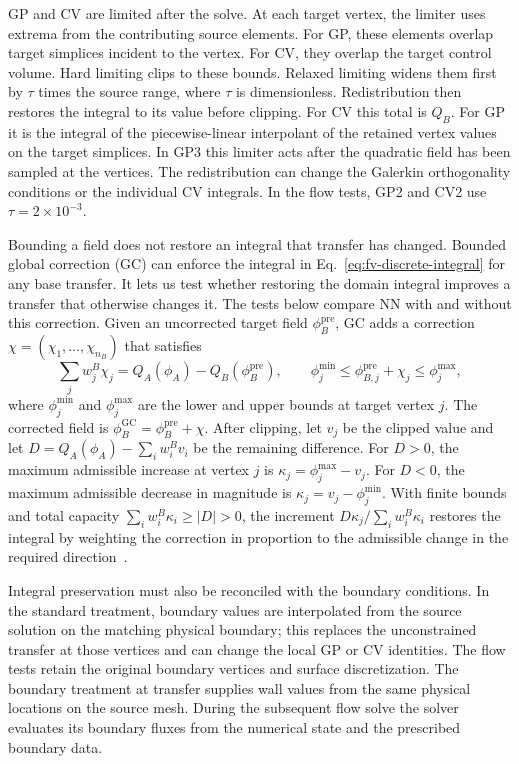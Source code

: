 \documentclass[a4paper,fleqn]{cas-sc}
\begin{document}
GP and CV are limited after the solve. At each target vertex, the limiter uses extrema from the contributing source elements. For GP, these elements overlap target simplices incident to the vertex. For CV, they overlap the target control volume. Hard limiting clips to these bounds. Relaxed limiting widens them first by $\tau$ times the source range, where $\tau$ is dimensionless. Redistribution then restores the integral to its value before clipping. For CV this total is $Q_B$. For GP it is the integral of the piecewise-linear interpolant of the retained vertex values on the target simplices. In GP3 this limiter acts after the quadratic field has been sampled at the vertices. The redistribution can change the Galerkin orthogonality conditions or the individual CV integrals. In the flow tests, GP2 and CV2 use $\tau=2\times10^{-3}$.

Bounding a field does not restore an integral that transfer has changed. Bounded global correction (GC) can enforce the integral in Eq.~\eqref{eq:fv-discrete-integral} for any base transfer. It lets us test whether restoring the domain integral improves a transfer that otherwise changes it. The tests below compare NN with and without this correction. Given an uncorrected target field $\phi_B^{\mathrm{pre}}$, GC adds a correction $\chi=(\chi_1,\ldots,\chi_{n_B})$ that satisfies
\begin{equation}
 \sum_jw_j^B\chi_j=Q_A(\phi_A)-Q_B(\phi_B^{\mathrm{pre}}),
 \qquad \phi_j^{\min}\leq\phi_{B,j}^{\mathrm{pre}}+\chi_j\leq \phi_j^{\max},
 \label{eq:global-correction-constraint}
\end{equation}
where $\phi_j^{\min}$ and $\phi_j^{\max}$ are the lower and upper bounds at target vertex $j$. The corrected field is $\phi_B^{\mathrm{GC}}=\phi_B^{\mathrm{pre}}+\chi$. After clipping, let $v_j$ be the clipped value and let $D=Q_A(\phi_A)-\sum_i w_i^B v_i$ be the remaining difference. For $D>0$, the maximum admissible increase at vertex $j$ is $\kappa_j=\phi_j^{\max}-v_j$. For $D<0$, the maximum admissible decrease in magnitude is $\kappa_j=v_j-\phi_j^{\min}$. With finite bounds and total capacity $\sum_i w_i^B\kappa_i\geq |D|>0$, the increment $D\kappa_j/\sum_i w_i^B\kappa_i$ restores the integral by weighting the correction in proportion to the admissible change in the required direction~\cite{ShashkovWendroff2004,KucharikShashkovWendroff2003}.

Integral preservation must also be reconciled with the boundary conditions. In the standard treatment, boundary values are interpolated from the source solution on the matching physical boundary; this replaces the unconstrained transfer at those vertices and can change the local GP or CV identities. The flow tests retain the original boundary vertices and surface discretization. The boundary treatment at transfer supplies wall values from the same physical locations on the source mesh. During the subsequent flow solve the solver evaluates its boundary fluxes from the numerical state and the prescribed boundary data.
\end{document}
